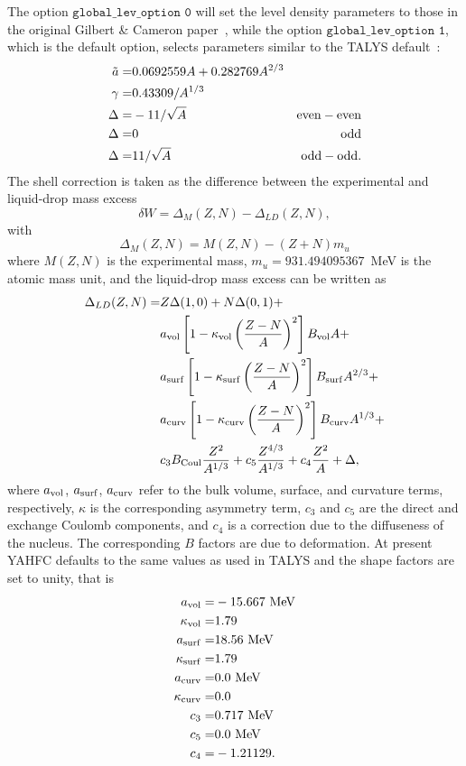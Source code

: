 \documentclass[
10pt,
showpacs,preprintnumbers,footinbib,
amsfonts,amsmath,amssymb,
aps,
prc,twocolumn,groupedaddress,superscriptaddress,
showkeys,
nofootinbib
]{revtex4-1}
\begin{document}
The option ${\texttt {global\_lev\_option 0}}$ will set the level density parameters to those in the original Gilbert \& Cameron paper~\cite{Gilbert:1965}, while the option ${\texttt {global\_lev\_option 1}}$, which is the default option, selects parameters similar to the TALYS default~\cite{TALYS}:
\begin{align}
\tilde a = & 0.0692559 A + 0.282769 A^{2/3} & \notag\\
\gamma = & 0.43309/A^{1/3} & \notag \\
\Delta =& -11/\sqrt{A} & {\rm {even-even}} \notag\\
\Delta =& 0 & {\rm {odd}}\notag\\
\Delta =& 11/\sqrt{A} & {\rm {odd-odd}}.
\end{align}
The shell correction is taken as the difference between the experimental and liquid-drop mass excess
\begin{equation}
\delta W = \Delta_M(Z,N) - \Delta_{LD}(Z,N),
\end{equation}
with
\begin{equation}
\Delta_M(Z,N) = M(Z,N) - (Z+N)m_u
\end{equation}
where $M(Z,N)$ is the experimental mass, $m_u = 931.494095367$~MeV is the atomic mass unit, and the liquid-drop mass excess can be written as~\cite{Myers:1966,Guet:1988,Moller:1988,Moller:1997}
\begin{align}
\Delta_{LD}(Z,N) = & Z \Delta(1,0) + N \Delta(0,1) + \notag \\
& a_{\rm vol} \left[1-\kappa_{\rm vol}\left( \frac{Z-N}{A}\right)^2\right ]B_{\rm vol}A + \notag \\
& a_{\rm surf} \left[1-\kappa_{\rm surf}\left( \frac{Z-N}{A}\right)^2\right ]B_{\rm surf}A^{2/3} + \notag \\
& a_{\rm curv} \left[1-\kappa_{\rm curv}\left( \frac{Z-N}{A}\right)^2\right ]B_{\rm curv}A^{1/3} + \notag \\
& c_3B_{\rm Coul}\frac{Z^2}{A^{1/3}} + c_5\frac{Z^{4/3}}{A^{1/3}} + c_4\frac{Z^2}{A} + \Delta,
\end{align}
where $a_{\rm vol}$, $a_{\rm surf}$, $a_{\rm curv}$ refer to the bulk volume, surface, and curvature terms, respectively, $\kappa$ is the corresponding asymmetry term, $c_3$ and $c_5$ are the direct and exchange Coulomb components, and $c_4$ is a correction due to the diffuseness of the nucleus. The corresponding $B$ factors are due to deformation. At present YAHFC defaults to the same values as used in TALYS and the shape factors are set to unity, that is
\begin{align}
a_{\rm vol} =& -15.667~{\rm MeV} \notag\\
\kappa_{\rm vol} = & 1.79 \notag\\
a_{\rm surf} =& 18.56~{\rm MeV} \notag\\
\kappa_{\rm surf} = & 1.79 \notag\\
a_{\rm curv} =& 0.0~{\rm MeV} \notag\\
\kappa_{\rm curv} = & 0.0 \notag\\
c_3 =& 0.717~{\rm MeV}\notag\\
c_5 =& 0.0~{\rm MeV}\notag\\
c_4 =& -1.21129.
\end{align}
\end{document}
